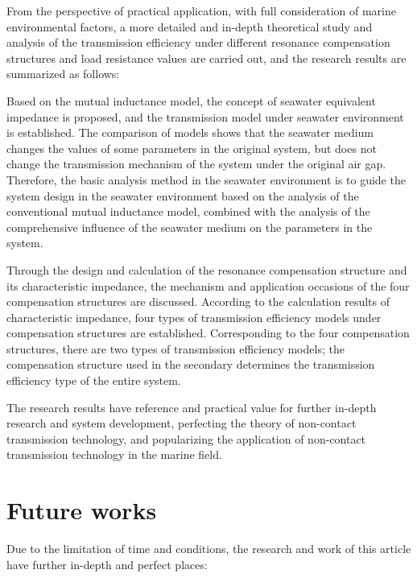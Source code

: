 From the perspective of practical application, with full consideration of marine environmental factors, a more detailed and in-depth theoretical study and analysis of the transmission efficiency under different resonance compensation structures and load resistance values are carried out, and the research results are summarized as follows:

Based on the mutual inductance model, the concept of seawater equivalent impedance is proposed, and the transmission model under seawater environment is established. The comparison of models shows that the seawater medium changes the values of some parameters in the original system, but does not change the transmission mechanism of the system under the original air gap. Therefore, the basic analysis method in the seawater environment is to guide the system design in the seawater environment based on the analysis of the conventional mutual inductance model, combined with the analysis of the comprehensive influence of the seawater medium on the parameters in the system.

Through the design and calculation of the resonance compensation structure and its characteristic impedance, the mechanism and application occasions of the four compensation structures are discussed. According to the calculation results of characteristic impedance, four types of transmission efficiency models under compensation structures are established. Corresponding to the four compensation structures, there are two types of transmission efficiency models; the compensation structure used in the secondary determines the transmission efficiency type of the entire system.

The research results have reference and practical value for further in-depth research and system development, perfecting the theory of non-contact transmission technology, and popularizing the application of non-contact transmission technology in the marine field.
\section{Future works}
Due to the limitation of time and conditions, the research and work of this article have further in-depth and perfect places:



